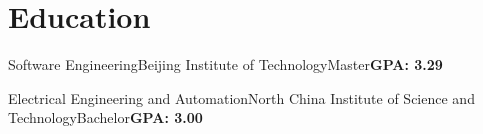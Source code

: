 

\section{Education}

{
}

{Software Engineering}{Beijing Institute of Technology}{Master}{\textbf{GPA: 3.29}}
{
}

{Electrical Engineering and Automation}{North China Institute of Science and Technology}{Bachelor}{\textbf{GPA: 3.00}}
{
}
